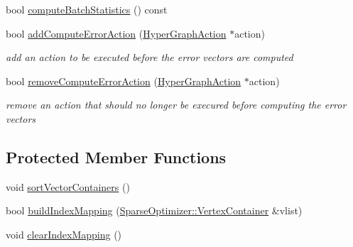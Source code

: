\begin{DoxyCompactItemize}
\item 
bool \hyperlink{classg2o_1_1SparseOptimizer_a4a4261f1008f1b0f660381b9c46b78f7}{compute\+Batch\+Statistics} () const 
\item 
bool \hyperlink{classg2o_1_1SparseOptimizer_a43517d9f9f23ba6041061c57dddd916d}{add\+Compute\+Error\+Action} (\hyperlink{classg2o_1_1HyperGraphAction}{Hyper\+Graph\+Action} $\ast$action)
\begin{DoxyCompactList}\small\item\em add an action to be executed before the error vectors are computed \end{DoxyCompactList}\item 
bool \hyperlink{classg2o_1_1SparseOptimizer_aaeb1bffea0c80d98b6650cbf51be2b80}{remove\+Compute\+Error\+Action} (\hyperlink{classg2o_1_1HyperGraphAction}{Hyper\+Graph\+Action} $\ast$action)
\begin{DoxyCompactList}\small\item\em remove an action that should no longer be execured before computing the error vectors \end{DoxyCompactList}\end{DoxyCompactItemize}
\subsection*{Protected Member Functions}
\begin{DoxyCompactItemize}
\item 
void \hyperlink{classg2o_1_1SparseOptimizer_a8a8c6f08bc9b8a4e520aa73198268991}{sort\+Vector\+Containers} ()
\item 
bool \hyperlink{classg2o_1_1SparseOptimizer_a8c6af9785e85153ade1490beacad73ce}{build\+Index\+Mapping} (\hyperlink{classg2o_1_1HyperGraph_a9339534c99300a0ddac87ba976ef188c}{Sparse\+Optimizer\+::\+Vertex\+Container} \&vlist)
\item 
void \hyperlink{classg2o_1_1SparseOptimizer_ab6f1f4ad2b1fd50b8019c6abb89ac6a8}{clear\+Index\+Mapping} ()
\end{DoxyCompactItemize}

